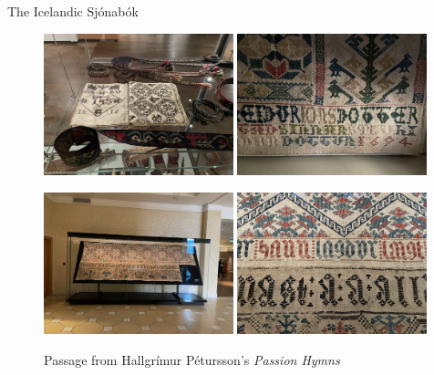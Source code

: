 \documentclass[
    NAME={Dr. Helga Ingimundardóttir},
    EMAIL={helgaingim@hi.is},
    FACULTY={Industrial Engineering},
    TITLE={HiDef Textiles: Reviving Tradition with Innovation},
    SUBTITLE={Empowering Creativity and Sustainability in Textile Production through Digital Transformation},
    SEMINAR={Reykjavík DataBeers},
    DATE={January 25, 2025},
    WIDE={true}
]{HI-LaTeX/hi-beamer}
\begin{document}
\begin{frame}[allowframebreaks]{The Icelandic Sjónabók}
        \begin{figure}
            \centering
            \caption{Manuscript at the Icelandic National Museum}
            \includegraphics[width=0.49\textwidth]{include/sjónabók-safn.jpg}
            \includegraphics[width=0.49\textwidth]{include/jonsdottir.jpg}

            \framebreak

            \caption{Passage from Hallgrímur Pétursson's  \textit{Passion Hymns}}
            \includegraphics[width=0.49\textwidth]{include/passiusalmur.jpg}
            \includegraphics[width=0.49\textwidth]{include/passiusalmur-zoom.jpg}



\end{figure}
\end{frame}
\end{document}
